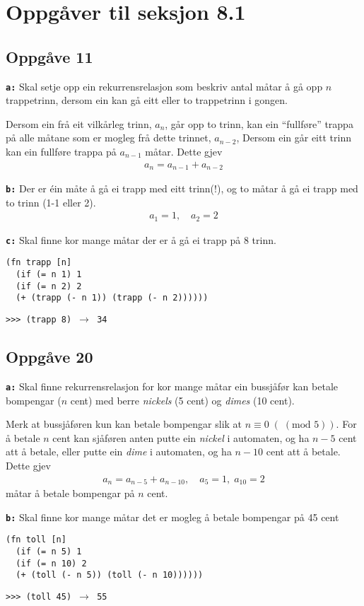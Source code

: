 \documentclass[a4paper, 11pt]{article}
\newcommand{\Modulo}[1]{\;(\text{mod }#1)}
\newcommand{\deloppg}[1]{\vspace{1mm}\noindent \textbf{\tt \themecolor{#1:}}}
\newcommand{\themeshade}{Mahogany}
\newcommand{\themecolor}[1]{\textcolor{\themeshade}{#1}}
\begin{document}
\newpage
\section*{Oppgåver til seksjon 8.1}
\subsection*{Oppgåve 11}
\deloppg{a} Skal setje opp ein rekurrensrelasjon som beskriv antal måtar å gå opp \(n\) trappetrinn,
dersom ein kan gå eitt eller to trappetrinn i gongen.

Dersom ein frå eit vilkårleg trinn, \(a_n\), går opp to trinn,
kan ein ``fullføre'' trappa på alle måtane som er mogleg frå dette trinnet, \(a_{n-2}\),
Dersom ein går eitt trinn kan ein fullføre trappa på \(a_{n-1}\) måtar. Dette gjev
\begin{align*}
    a_n = a_{n-1}+a_{n-2}
\end{align*}

\deloppg{b} Der er éin måte å gå ei trapp med eitt trinn(!), og to måtar å gå ei trapp med to trinn (1-1 eller 2).
\begin{align*}
    a_1 = 1, \quad a_2 = 2
\end{align*}

\deloppg{c} Skal finne kor mange måtar der er å gå ei trapp på 8 trinn.
\begin{lstlisting}[language=Lie]
(fn trapp [n]
  (if (= n 1) 1
  (if (= n 2) 2
  (+ (trapp (- n 1)) (trapp (- n 2))))))
\end{lstlisting}
{\tt >>> (trapp 8) \(\rightarrow\) 34}


\subsection*{Oppgåve 20}
\deloppg{a} Skal finne rekurrensrelasjon for kor mange måtar ein bussjåfør kan betale bompengar (\(n\) cent) med berre
{\em nickels} (5 cent) og {\em dimes} (10 cent).

Merk at bussjåføren kun kan betale bompengar slik at \(n \equiv 0 \;(\Modulo 5)\).
For å betale \(n\) cent kan sjåføren anten putte ein {\em nickel} i automaten, og
ha \(n - 5\) cent att å betale, eller putte ein {\em dime} i automaten, og ha \(n - 10\)
cent att å betale. Dette gjev
\begin{align*}
    a_n = a_{n - 5} + a_{n - 10}, \quad a_5 = 1, \; a_{10} = 2
\end{align*}
måtar å betale bompengar på \(n\) cent.

\deloppg{b} Skal finne kor mange måtar det er mogleg å betale bompengar på 45 cent
\begin{lstlisting}[language=Lie]
(fn toll [n]
  (if (= n 5) 1
  (if (= n 10) 2
  (+ (toll (- n 5)) (toll (- n 10))))))
\end{lstlisting}
{\tt >>> (toll 45) \(\rightarrow\) 55}
\end{document}
